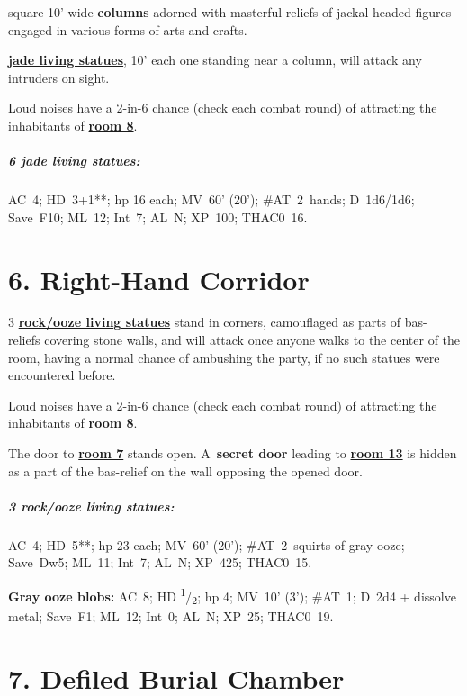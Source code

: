 \documentclass[english,11pt,openany,letterpaper,twocolumn]{book}
\newcommand{\half}{\textsuperscript{1}/\textsubscript{2}}
\begin{document}
 square 10'-wide \textbf{columns} adorned with masterful reliefs of jackal-headed figures engaged in various forms of arts and crafts.

 \hyperlink{statue}{\textbf{jade living statues}}, 10' each one standing near a column, will attack any intruders on sight.

\tab Loud noises have a 2-in-6 chance (check each combat round) of attracting the inhabitants of \hyperlink{room8}{\textbf{room 8}}.


\begin{textbox}
	\subparagraph{6 jade living statues:} AC~4; HD~3+1**; hp 16 each; MV~60' (20'); \#AT~2~hands; D~1d6/1d6; Save~F10; ML~12; Int~7; AL~N; XP~100; THAC0~16.
\end{textbox}

\enlargethispage{\baselineskip}

\break

\hypertarget{room6}{}
\section{6. Right-Hand Corridor}

3 \hyperlink{statue}{\textbf{rock/ooze living statues}} stand in corners, camouflaged as parts of bas- reliefs covering stone walls, and will attack once anyone walks to the center of the room, having a normal chance of ambushing the party, if no such statues were encountered before.

\tab Loud noises have a 2-in-6 chance (check each combat round) of attracting the inhabitants of \hyperlink{room8}{\textbf{room 8}}.

\tab The door to \hyperlink{room7}{\textbf{room 7}} stands open. A~\textbf{secret door} leading to \hyperlink{room13}{\textbf{room 13}} is hidden as a part of the bas-relief on the wall opposing the opened door.

\begin{textbox}
	\subparagraph{3 rock/ooze living statues:} AC~4; HD~5**; hp 23 each; MV~60' (20'); \#AT~2~squirts of gray ooze; Save~Dw5; ML~11; Int~7; AL~N; XP~425; THAC0~15.
	
	\textbf{Gray ooze blobs:} AC~8; HD \half; hp 4; MV~10' (3'); \#AT~1; D~2d4 + dissolve metal; Save~F1; ML~12; Int~0; AL~N; XP~25; THAC0~19.
\end{textbox}


\hypertarget{room7}{}
\section{7. Defiled Burial Chamber}
\end{document}
